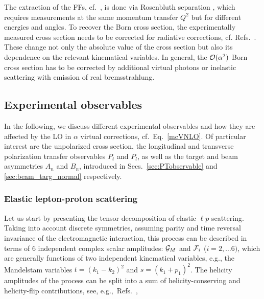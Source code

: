 The extraction of the FFs, cf.\ , is done via Rosenbluth separation  \cite{Rosenbluth:1950yq}, which  requires measurements at the same momentum transfer $Q^2$ but for different energies and angles. To recover the Born cross section, the experimentally measured cross section needs to be corrected for radiative corrections, cf. Refs.~\cite{Maximon:2000hm,Mo:1968cg,Ent:2001hm,Gramolin:2014pva,Gerasimov:2015aoa,Bystritskiy:2007hw}. These change not only the absolute value of the cross section but also its dependence on the relevant kinematical variables. In general, the  $\mathcal{O}(\alpha^2)$ Born cross section has to be corrected by additional virtual photons or inelastic scattering with emission of real bremsstrahlung. 





\subsection{Experimental observables}
In the following, we discuss different experimental observables and how they are affected by the LO in $\alpha$ virtual corrections, cf.\ Eq.~\ref{mcVNLO}. Of particular interest are the unpolarized cross section, the longitudinal and transverse polarization transfer observables $P_t$ and $P_l$, as well as the target and beam asymmetries $A_n$ and $B_n$, introduced in Secs.~\ref{sec:PTobservable} and \ref{sec:beam_targ_normal} respectively.

\subsubsection{Elastic lepton-proton scattering}

Let us start by presenting the tensor decomposition of elastic $\ell p$ scattering. 
Taking into account discrete symmetries, assuming parity and time reversal invariance of the electromagnetic interaction, this process can be described in terms of $6$ independent complex scalar amplitudes: ${\cal G}_M$ and ${\cal F}_i$ ($i=2,\dots 6)$, which are generally functions of two
independent kinematical variables, e.g., the Mandelstam variables $t=(k_1-k_2)^2$ and $s=(k_1+p_1)^2$.  The helicity amplitudes of the process can be split into a sum of helicity-conserving and helicity-flip  contributions, see, e.g.,\ Refs.~\cite{Guichon:2003qm,Gorchtein:2004ac,Gakh:2014zva},

